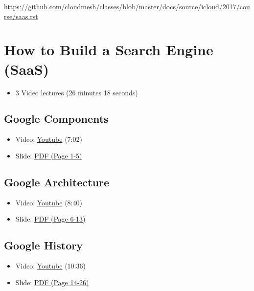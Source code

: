 \begin{fileremark}\url{https://github.com/cloudmesh/classes/blob/master/docs/source/icloud/2017/course/saas.rst}\end{fileremark}
\section{How to Build a Search Engine
(SaaS)}\label{how-to-build-a-search-engine-saas}

\begin{itemize}
\tightlist
\item
  3 Video lectures (26 minutes 18 seconds)
\end{itemize}

\subsection{Google Components}\label{google-components}

\begin{itemize}
\tightlist
\item
  Video: \href{https://www.youtube.com/watch?v=IWMcv7HbbPM}{Youtube}
  (7:02)
\item
  Slide:
  \href{https://drive.google.com/open?id=0B88HKpainTSfYWZ0dDlrNThkVms}{PDF
  (Page 1-5)}
\end{itemize}

\subsection{Google Architecture}\label{google-architecture}

\begin{itemize}
\tightlist
\item
  Video: \href{https://www.youtube.com/watch?v=syZHezdbdRY}{Youtube}
  (8:40)
\item
  Slide:
  \href{https://drive.google.com/open?id=0B88HKpainTSfYWZ0dDlrNThkVms}{PDF
  (Page 6-13)}
\end{itemize}

\subsection{Google History}\label{google-history}

\begin{itemize}
\tightlist
\item
  Video: \href{https://www.youtube.com/watch?v=Kg0NK0XUkHw}{Youtube}
  (10:36)
\item
  Slide:
  \href{https://drive.google.com/open?id=0B88HKpainTSfYWZ0dDlrNThkVms}{PDF
  (Page 14-26)}
\end{itemize}
